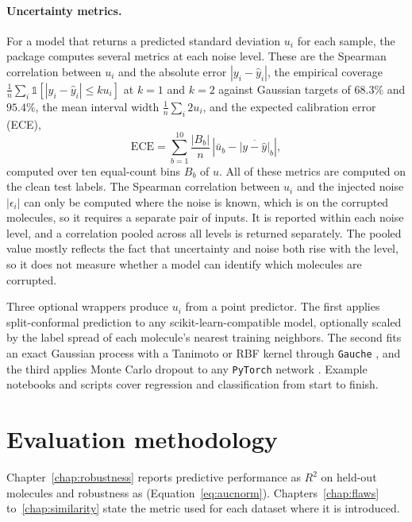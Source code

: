 \paragraph{Uncertainty metrics.} For a model that returns a predicted standard deviation
$u_i$ for each sample, the package computes several metrics at each noise level. These are the Spearman correlation between $u_i$ and the
absolute error $|y_i - \hat{y}_i|$, the empirical coverage $\frac{1}{n}\sum_i \mathbb{1}\left[|y_i -
\hat{y}_i| \le k u_i\right]$ at $k = 1$ and $k = 2$ against Gaussian targets of $68.3\%$ and
$95.4\%$, the mean interval width $\frac{1}{n}\sum_i 2u_i$, and the expected calibration error (ECE),
\begin{equation}
\mathrm{ECE} = \sum_{b=1}^{10} \frac{|B_b|}{n}\,\left|\bar{u}_b - \overline{|y - \hat{y}|}_b\right|,
\label{eq:ece}
\end{equation}
computed over ten equal-count bins $B_b$ of $u$. All of these metrics are computed on the clean test labels. The Spearman
correlation between $u_i$ and the injected noise $|\epsilon_i|$ can only be computed where the noise
is known, which is on the corrupted molecules, so it requires a separate pair of inputs. It is reported
within each noise level, and a correlation pooled across all levels is returned separately. The pooled value
mostly reflects the fact that uncertainty and noise both rise with the level, so it
does not measure whether a model can identify which molecules are corrupted.

Three optional wrappers produce $u_i$ from a point predictor. The first applies split-conformal prediction to any
scikit-learn-compatible model, optionally scaled by the label spread of each molecule's nearest
training neighbors. The second fits an exact Gaussian process with a Tanimoto or RBF kernel through \texttt{Gauche}
\citep{gauche}, and the third applies Monte Carlo dropout to any \texttt{PyTorch} network \citep{gal2016}. Example
notebooks and scripts cover regression and classification from start to finish.


\section{Evaluation methodology}

Chapter~\ref{chap:robustness} reports predictive performance as $R^2$ on held-out molecules and robustness as \aucnorm{} (Equation~\ref{eq:aucnorm}). Chapters~\ref{chap:flaws} to~\ref{chap:similarity} state the metric used for each dataset where it is introduced.

